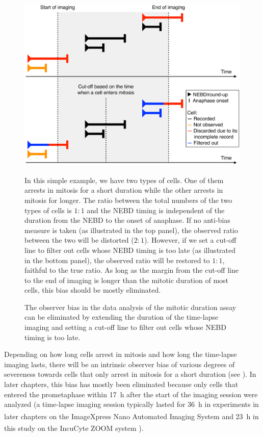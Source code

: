 \begin{figure}
    \centering
    \includegraphics[width=\textwidth]{chapters/figures/CancelIXNAnalysisObserverBias.pdf}
    \caption{The observer bias in the data analysis of the mitotic duration assay can be eliminated by extending the duration of the time-lapse imaging and setting a cut-off line to filter out cells whose NEBD timing is too late.}
    \noindent \justifying In this simple example, we have two types of cells. One of them arrests in mitosis for a short duration while the other arrests in mitosis for longer. The ratio between the total numbers of the two types of cells is $1 : 1$ and the NEBD timing is independent of the duration from the NEBD to the onset of anaphase. If no anti-bias measure is taken (as illustrated in the top panel), the observed ratio between the two will be distorted ($2 : 1$). However, if we set a cut-off line to filter out cells whose NEBD timing is too late (as illustrated in the bottom panel), the observed ratio will be restored to $1 : 1$, faithful to the true ratio. As long as the margin from the cut-off line to the end of imaging is longer than the mitotic duration of most cells, this bias should be mostly eliminated.
    \label{CancelIXNAnalysisObserverBias}
\end{figure}

Depending on how long cells arrest in mitosis and how long the time-lapse imaging lasts, there will be an intrinsic observer bias of various degrees of severeness towards cells that only arrest in mitosis for a short duration (see ). In later chapters, this bias has mostly been eliminated because only cells that entered the prometaphase within \SI{17}{h} after the start of the imaging session were analyzed (a time-lapse imaging session typically lasted for \SI{36}{h} in experiments in later chapters on the ImageXpress\textsuperscript{\textregistered} Nano Automated Imaging System and \SI{23}{h} in this study on the IncuCyte\textsuperscript{\textregistered} ZOOM system \cite{eSAC}).

